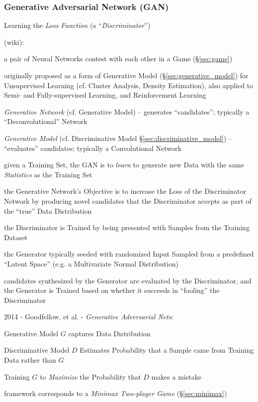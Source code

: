 \subsubsection{Generative Adversarial Network (GAN)}\label{sec:gan}

Learning the \emph{Loss Function} (a ``\emph{Discriminator}'')

(wiki):

a pair of Neural Networks contest with each other in a Game (\S\ref{sec:game})

originally proposed as a form of Generative Model
(\S\ref{sec:generative_model}) for Unsupervised Learning (cf. Cluster Analysis,
Density Estimation),
also applied to Semi- and Fully-supervised Learning, and Reinforcement Learning

\emph{Generative Network} (cf. Generative Model) -- generates ``candidates'';
typically a ``Deconvolutional'' Network

\emph{Generative Model} (cf. Discriminative Model
\S\ref{sec:discriminative_model}) -- ``evaluates'' candidates; typically a
Convolutional Network

given a Training Set, the GAN is to \emph{learn} to generate new Data with the
same \emph{Statistics} as the Training Set

the Generative Network's Objective is to increase the Loss of the Discriminator
Network by producing novel candidates that the Discriminator accepts as part of
the ``true'' Data Distribution

the Discriminator is Trained by being presented with Samples from the Training
Dataset

the Generator typically seeded with randomized Input Sampled from a predefined
``Latent Space'' (e.g. a Multivariate Normal Distribution)

candidates synthesized by the Generator are evaluated by the Discriminator, and
the Generator is Trained based on whether it succeeds in ``fooling'' the
Discriminator

2014 - Goodfellow, et al. - \emph{Generative Adversarial Nets}:

Generative Model $G$ captures Data Distribution

Discriminative Model $D$ Estimates Probability that a Sample came from Training
Data rather than $G$

Training $G$ to \emph{Maximize} the Probability that $D$ makes a mistake

framework corresponds to a \emph{Minimax Two-player Game} (\S\ref{sec:minimax})

